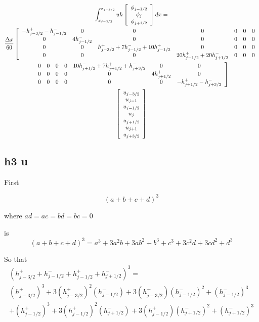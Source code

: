 \documentclass[12pt]{article}
\begin{document}
\begin{landscape}
	\begin{multline*}
	\int_{x_{j-3/2}}^{x_{j+3/2}} uh \left[\begin{array}{c}\phi_{j-1/2} \\\phi_{j}\\\phi_{j+1/2} \end{array}\right] dx = \\
	\frac{\Delta x}{60} \left[\begin{array}{c c c c c c c}
	- h^+ _{j - 3/2} - h^- _{j - 1/2}  & 0 & 0 &0 &0 & 0 & 0  \\
	0 &4h^- _{j - 1/2} & 0 & 0 &0 & 0 &0  \\
	0 & 0 &h^+ _{j - 3/2} + 7h^- _{j - 1/2} + 10 h^+ _{j - 1/2}  & 0 & 0 & 0 &0  \\ 
	0 & 0 & 0 & 20h^+ _{j - 1/2} +  20 h^- _{j + 1/2}& 0 & 0 &0 \end{array} \right. \\ 
	\left. \begin{array}{c c c c c c c}
	0 & 0 & 0 & 0 & 10h^- _{j + 1/2} + 7h^+ _{j + 1/2} +h^- _{j + 3/2} & 0 &0  \\
	0 & 0 & 0 & 0 &0 & 4 h^+ _{j + 1/2}  &0\\
	0 & 0 & 0 & 0 &0 & 0 &-h^+ _{j + 1/2} - h^- _{j + 3/2} \end{array}\right]\\ 
	\left[\begin{array}{c}u_{j-3/2} \\ u_{j-1} \\u_{j-1/2} \\u_{j}\\u_{j+1/2} \\ u_{j+1} \\ u_{j+3/2} \end{array}\right]
	\end{multline*}
\end{landscape}

\subsection{h3 u}

First

\[\left(a + b + c+ d\right)^3 \]

where $ad = ac = bd = bc = 0$

is
\[\left(a + b + c+ d\right)^3 =  a^3 + 3 a^2b + 3ab^2 + b^3 + c^3 + 3c^2d + 3cd^2 + d^3\]

So that
\begin{multline*}
\left(h^+_{j - 3/2} + h^-_{j - 1/2} + h^+_{j - 1/2} + h^-_{j + 1/2}\right)^3 = \\
\left(h^+_{j - 3/2}\right)^3 + 3 \left(h^+_{j - 3/2}\right)^2 \left(h^-_{j - 1/2}\right)
+ 3 \left(h^+_{j - 3/2}\right) \left(h^-_{j - 1/2}\right)^2 +  \left(h^-_{j - 1/2}\right)^3 \\ + \left(h^+_{j - 1/2} \right)^3 + 3 \left(h^+_{j - 1/2} \right)^2\left(h^-_{j + 1/2}\right) + 3 \left(h^+_{j - 1/2} \right)\left(h^-_{j + 1/2}\right)^2 + \left(h^-_{j + 1/2}\right)^3
\end{multline*}
\end{document}
